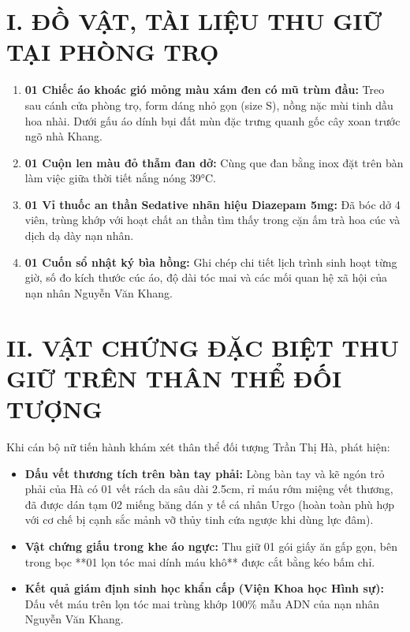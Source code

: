 \documentclass[12pt,a4paper]{article}
\begin{document}
\section*{I. ĐỒ VẬT, TÀI LIỆU THU GIỮ TẠI PHÒNG TRỌ}
\begin{enumerate}[label=\arabic*., leftmargin=1.5cm]
    \item \textbf{01 Chiếc áo khoác gió mỏng màu xám đen có mũ trùm đầu:} Treo sau cánh cửa phòng trọ, form dáng nhỏ gọn (size S), nồng nặc mùi tinh dầu hoa nhài. Dưới gấu áo dính bụi đất mùn đặc trưng quanh gốc cây xoan trước ngõ nhà Khang.
    \item \textbf{01 Cuộn len màu đỏ thẫm đan dở:} Cùng que đan bằng inox đặt trên bàn làm việc giữa thời tiết nắng nóng 39°C.
    \item \textbf{01 Vỉ thuốc an thần Sedative nhãn hiệu Diazepam 5mg:} Đã bóc dở 4 viên, trùng khớp với hoạt chất an thần tìm thấy trong cặn ấm trà hoa cúc và dịch dạ dày nạn nhân.
    \item \textbf{01 Cuốn sổ nhật ký bìa hồng:} Ghi chép chi tiết lịch trình sinh hoạt từng giờ, số đo kích thước cúc áo, độ dài tóc mai và các mối quan hệ xã hội của nạn nhân Nguyễn Văn Khang.
\end{enumerate}

\section*{II. VẬT CHỨNG ĐẶC BIỆT THU GIỮ TRÊN THÂN THỂ ĐỐI TƯỢNG}
Khi cán bộ nữ tiến hành khám xét thân thể đối tượng Trần Thị Hà, phát hiện:
\begin{itemize}[leftmargin=1.5cm]
    \item \textbf{Dấu vết thương tích trên bàn tay phải:} Lòng bàn tay và kẽ ngón trỏ phải của Hà có 01 vết rách da sâu dài 2.5cm, rỉ máu rớm miệng vết thương, đã được dán tạm 02 miếng băng dán y tế cá nhân Urgo (hoàn toàn phù hợp với cơ chế bị cạnh sắc mảnh vỡ thủy tinh cứa ngược khi dùng lực đâm).
    \item \textbf{Vật chứng giấu trong khe áo ngực:} Thu giữ 01 gói giấy ăn gấp gọn, bên trong bọc **01 lọn tóc mai dính máu khô** được cắt bằng kéo bấm chỉ.
    \item \textbf{Kết quả giám định sinh học khẩn cấp (Viện Khoa học Hình sự):} Dấu vết máu trên lọn tóc mai trùng khớp 100\% mẫu ADN của nạn nhân Nguyễn Văn Khang.
\end{itemize}

\vspace{0.8cm}
\end{document}
